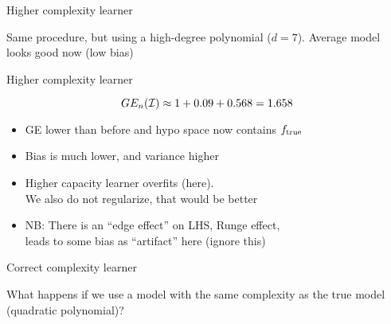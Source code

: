 \documentclass[11pt,compress,t,notes=noshow, xcolor=table]{beamer}
\begin{document}
\begin{framei}[sep=M]{Higher complexity learner}

\item Same procedure, but using a high-degree polynomial ($d=7$). Average model looks good now (low bias)

\hfill


\end{framei} 

\begin{frame}{Higher complexity learner}

\splitVThree
{}
{}
{}


$$GE_n(\mathcal{I}) \approx 1 + 0.09 + 0.568 = 1.658 $$

\vfill

\begin{itemize}
\item GE lower than before and hypo space now contains $f_{\text{true}}$
\item Bias is much lower, and variance higher 
\item Higher capacity learner overfits (here).\\
We also do not regularize, that would be better

\item NB: There is an ``edge effect'' on LHS, Runge effect,\\
leads to some bias as ``artifact'' here (ignore this)
\end{itemize}

\end{frame}

\begin{framei}[sep=M]{Correct complexity learner}

\item What happens if we use a model with the same complexity as the true model (quadratic polynomial)? 

\hfill


\end{framei}
\end{document}
